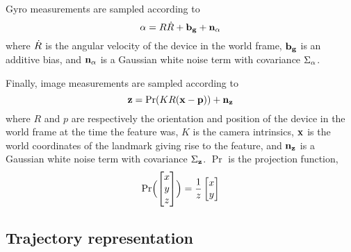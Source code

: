 
Gyro measurements are sampled according to
\begin{equation}
  \mathbf{\alpha} = R \dot{R} + \mathbf{b_g} + \mathbf{n_{\mathbf{\alpha}}}
\end{equation}
where $\dot{R}$ is the angular velocity of the device in the
world frame, $\mathbf{b_g}$ is an additive bias, and $\mathbf{n_{\mathbf{\alpha}}}$ is a
Gaussian white noise term with covariance $\Sigma_{\mathbf{\alpha}}$.

Finally, image measurements are sampled according to
\begin{equation}
  \mathbf{z} = \Pr(K R (\mathbf{x} - \mathbf{p})) + \mathbf{n_{\mathbf{z}}}
\end{equation}
where $R$ and $p$ are respectively the orientation and position of the
device in the world frame at the time the feature was, $K$ is the
camera intrinsics, $\mathbf{x}$ is the world coordinates of the
landmark giving rise to the feature, and $\mathbf{n_{\mathbf{z}}}$ is a Gaussian
white noise term with covariance $\Sigma_{\mathbf{z}}$. $\Pr$ is the
projection function,
\begin{equation}
  \Pr\Bigl(\begin{bmatrix}x\\y\\z\end{bmatrix}\Bigr) =
    \frac{1}{z}\begin{bmatrix}x\\y\end{bmatrix}
\end{equation}

\subsection{Trajectory representation}

